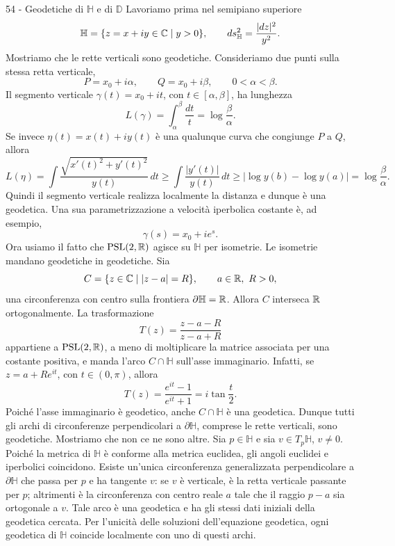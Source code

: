 \documentclass[a4paper]{article}
\begin{document}
\begin{snippetsolution}{54 - Geodetiche di \(\mathbb{H}\) e di \(\mathbb{D}\)}
    Lavoriamo prima nel semipiano superiore
    \[
        \mathbb{H}=\{z=x+iy\in\mathbb{C}\mid y>0\},
        \qquad
        ds^2_{\mathbb{H}}=\frac{|dz|^2}{y^2}.
    \]
    Mostriamo che le rette verticali sono geodetiche. Consideriamo due punti sulla stessa retta verticale,
    \[
        P=x_0+i\alpha,
        \qquad
        Q=x_0+i\beta,
        \qquad
        0<\alpha<\beta.
    \]
    Il segmento verticale \(\gamma(t)=x_0+it\), con \(t\in[\alpha,\beta]\), ha lunghezza
    \[
        L(\gamma)=\int_\alpha^\beta \frac{dt}{t}
        =
        \log\frac{\beta}{\alpha}.
    \]
    Se invece \(\eta(t)=x(t)+iy(t)\) è una qualunque curva che congiunge \(P\) a \(Q\), allora
    \[
        L(\eta)
        =
        \int \frac{\sqrt{x'(t)^2+y'(t)^2}}{y(t)}\,dt
        \geq
        \int \frac{|y'(t)|}{y(t)}\,dt
        \geq
        \left|\log y(b)-\log y(a)\right|
        =
        \log\frac{\beta}{\alpha}.
    \]
    Quindi il segmento verticale realizza localmente la distanza e dunque è una geodetica. Una sua parametrizzazione a velocità iperbolica costante è, ad esempio,
    \[
        \gamma(s)=x_0+ie^s.
    \]
    Ora usiamo il fatto che \(\operatorname{PSL}(2,\mathbb{R})\) agisce su \(\mathbb{H}\) per isometrie. Le isometrie mandano geodetiche in geodetiche. Sia
    \[
        C=\{z\in\mathbb{C}\mid |z-a|=R\},
        \qquad a\in\mathbb{R},\ R>0,
    \]
    una circonferenza con centro sulla frontiera \(\partial\mathbb{H}=\mathbb{R}\). Allora \(C\) interseca \(\mathbb{R}\) ortogonalmente. La trasformazione
    \[
        T(z)=\frac{z-a-R}{z-a+R}
    \]
    appartiene a \(\operatorname{PSL}(2,\mathbb{R})\), a meno di moltiplicare la matrice associata per una costante positiva, e manda l'arco \(C\cap\mathbb{H}\) sull'asse immaginario. Infatti, se \(z=a+Re^{it}\), con \(t\in(0,\pi)\), allora
    \[
        T(z)=\frac{e^{it}-1}{e^{it}+1}
        =
        i\tan\frac{t}{2}.
    \]
    Poiché l'asse immaginario è geodetico, anche \(C\cap\mathbb{H}\) è una geodetica. Dunque tutti gli archi di circonferenze perpendicolari a \(\partial\mathbb{H}\), comprese le rette verticali, sono geodetiche.
    Mostriamo che non ce ne sono altre. Sia \(p\in\mathbb{H}\) e sia \(v\in T_p\mathbb{H}\), \(v\neq0\). Poiché la metrica di \(\mathbb{H}\) è conforme alla metrica euclidea, gli angoli euclidei e iperbolici coincidono. Esiste un'unica circonferenza generalizzata perpendicolare a \(\partial\mathbb{H}\) che passa per \(p\) e ha tangente \(v\): se \(v\) è verticale, è la retta verticale passante per \(p\); altrimenti è la circonferenza con centro reale \(a\) tale che il raggio \(p-a\) sia ortogonale a \(v\). Tale arco è una geodetica e ha gli stessi dati iniziali della geodetica cercata. Per l'unicità delle soluzioni dell'equazione geodetica, ogni geodetica di \(\mathbb{H}\) coincide localmente con uno di questi archi.

\end{snippetsolution}
\end{document}
